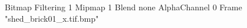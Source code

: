 {Bitmap
	{Filtering 1}
	{Mipmap 1}
	{Blend none}
	{AlphaChannel 0}
	{Frame "shed_brick01_x.tif.bmp"}
}
